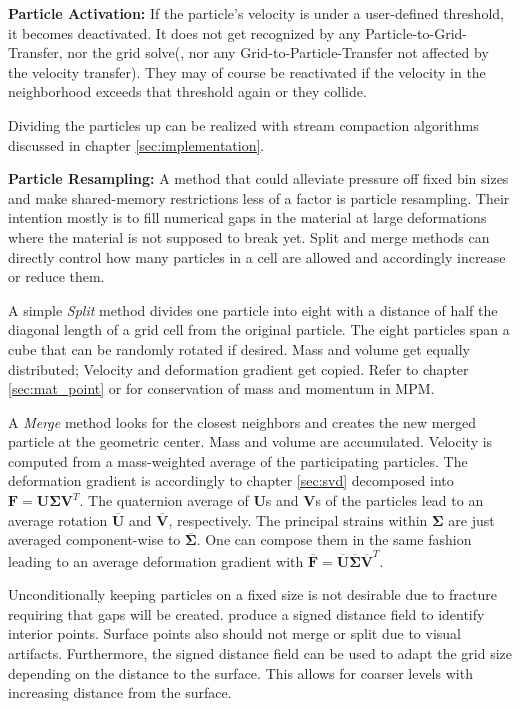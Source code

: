 \documentclass[m,times]{cgMA}
\begin{document}
\textbf{Particle Activation:} If the particle's velocity is under a user-defined threshold, it becomes deactivated. It does not get recognized by any Particle-to-Grid-Transfer, nor the grid solve(, nor any Grid-to-Particle-Transfer not affected by the velocity transfer). They may of course be reactivated if the velocity in the neighborhood exceeds that threshold again or they collide. \cite{MPM:GPU}

Dividing the particles up can be realized with stream compaction algorithms discussed in chapter \ref{sec:implementation}.

\textbf{Particle Resampling:} A method that could alleviate pressure off fixed bin sizes and make shared-memory restrictions less of a factor is particle resampling. Their intention mostly is to fill numerical gaps in the material at large deformations where the material is not supposed to break yet. Split and merge methods can directly control how many particles in a cell are allowed and accordingly increase or reduce them.

A simple \textit{Split} method divides one particle into eight with a distance of half the diagonal length of a grid cell from the original particle. The eight particles span a cube that can be randomly rotated if desired. Mass and volume get equally distributed; Velocity and deformation gradient get copied. Refer to chapter \ref{sec:mat_point} or for conservation of mass and momentum in MPM. \cite{gao2017adaptive}

A \textit{Merge} method looks for the closest neighbors and creates the new merged particle at the geometric center. Mass and volume are accumulated. Velocity is computed from a mass-weighted average of the participating particles. The deformation gradient is accordingly to chapter \ref{sec:svd} decomposed into $\boldsymbol{F} = \boldsymbol{U}\boldsymbol{\Sigma}\boldsymbol{V}^T$. The quaternion average of $\boldsymbol{U}$s and $\boldsymbol{V}$s of the particles lead to an average rotation $\overline{\boldsymbol{U}}$ and $\overline{\boldsymbol{V}}$, respectively. The principal strains within $\boldsymbol{\Sigma}$ are just averaged component-wise to $\overline{\boldsymbol{\Sigma}}$. One can compose them in the same fashion leading to an average deformation gradient with $\overline{\boldsymbol{F}} = \overline{\boldsymbol{U}}\overline{\boldsymbol{\Sigma}}\overline{\boldsymbol{V}}^T$.\cite{gao2017adaptive}

Unconditionally keeping particles on a fixed size is not desirable due to fracture requiring that gaps will be created. \cite{gao2017adaptive} produce a signed distance field to identify interior points. Surface points also should not merge or split due to visual artifacts. Furthermore, the signed distance field can be used to adapt the grid size depending on the distance to the surface. This allows for coarser levels with increasing distance from the surface.
\clearpage
\end{document}
